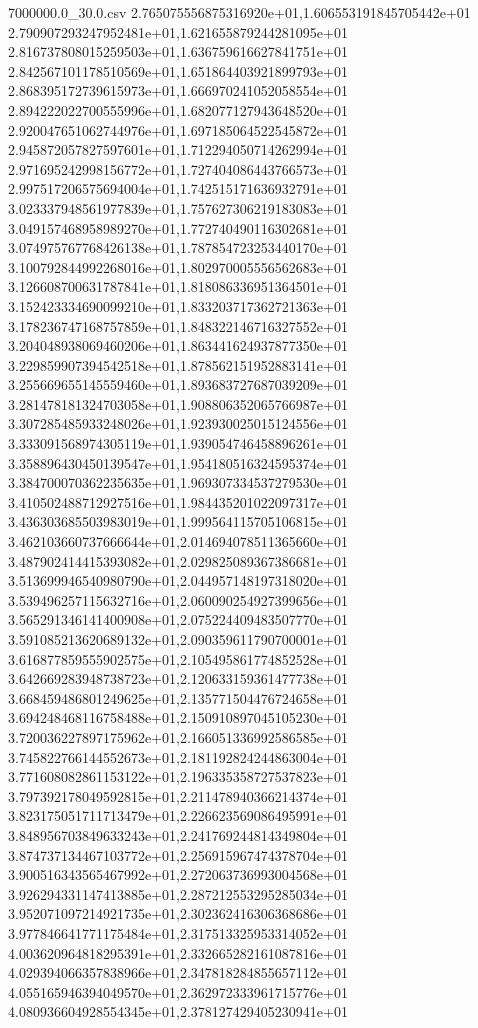 \begin{filecontents*}{7000000.0_30.0.csv}
2.765075556875316920e+01,1.606553191845705442e+01
2.790907293247952481e+01,1.621655879244281095e+01
2.816737808015259503e+01,1.636759616627841751e+01
2.842567101178510569e+01,1.651864403921899793e+01
2.868395172739615973e+01,1.666970241052058554e+01
2.894222022700555996e+01,1.682077127943648520e+01
2.920047651062744976e+01,1.697185064522545872e+01
2.945872057827597601e+01,1.712294050714262994e+01
2.971695242998156772e+01,1.727404086443766573e+01
2.997517206575694004e+01,1.742515171636932791e+01
3.023337948561977839e+01,1.757627306219183083e+01
3.049157468958989270e+01,1.772740490116302681e+01
3.074975767768426138e+01,1.787854723253440170e+01
3.100792844992268016e+01,1.802970005556562683e+01
3.126608700631787841e+01,1.818086336951364501e+01
3.152423334690099210e+01,1.833203717362721363e+01
3.178236747168757859e+01,1.848322146716327552e+01
3.204048938069460206e+01,1.863441624937877350e+01
3.229859907394542518e+01,1.878562151952883141e+01
3.255669655145559460e+01,1.893683727687039209e+01
3.281478181324703058e+01,1.908806352065766987e+01
3.307285485933248026e+01,1.923930025015124556e+01
3.333091568974305119e+01,1.939054746458896261e+01
3.358896430450139547e+01,1.954180516324595374e+01
3.384700070362235635e+01,1.969307334537279530e+01
3.410502488712927516e+01,1.984435201022097317e+01
3.436303685503983019e+01,1.999564115705106815e+01
3.462103660737666644e+01,2.014694078511365660e+01
3.487902414415393082e+01,2.029825089367386681e+01
3.513699946540980790e+01,2.044957148197318020e+01
3.539496257115632716e+01,2.060090254927399656e+01
3.565291346141400908e+01,2.075224409483507770e+01
3.591085213620689132e+01,2.090359611790700001e+01
3.616877859555902575e+01,2.105495861774852528e+01
3.642669283948738723e+01,2.120633159361477738e+01
3.668459486801249625e+01,2.135771504476724658e+01
3.694248468116758488e+01,2.150910897045105230e+01
3.720036227897175962e+01,2.166051336992586585e+01
3.745822766144552673e+01,2.181192824244863004e+01
3.771608082861153122e+01,2.196335358727537823e+01
3.797392178049592815e+01,2.211478940366214374e+01
3.823175051711713479e+01,2.226623569086495991e+01
3.848956703849633243e+01,2.241769244814349804e+01
3.874737134467103772e+01,2.256915967474378704e+01
3.900516343565467992e+01,2.272063736993004568e+01
3.926294331147413885e+01,2.287212553295285034e+01
3.952071097214921735e+01,2.302362416306368686e+01
3.977846641771175484e+01,2.317513325953314052e+01
4.003620964818295391e+01,2.332665282161087816e+01
4.029394066357838966e+01,2.347818284855657112e+01
4.055165946394049570e+01,2.362972333961715776e+01
4.080936604928554345e+01,2.378127429405230941e+01

\end{filecontents*}
